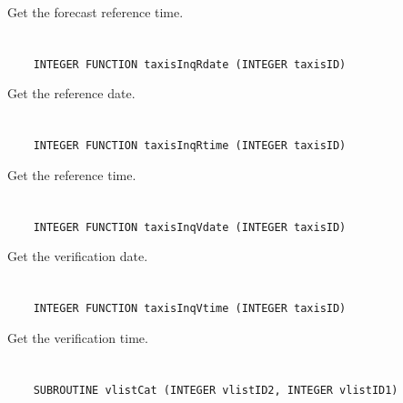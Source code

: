 Get the forecast reference time.


\section*{\tt {}}

\begin{verbatim}
    INTEGER FUNCTION taxisInqRdate (INTEGER taxisID)
\end{verbatim}

Get the reference date.


\section*{\tt {}}

\begin{verbatim}
    INTEGER FUNCTION taxisInqRtime (INTEGER taxisID)
\end{verbatim}

Get the reference time.


\section*{\tt {}}

\begin{verbatim}
    INTEGER FUNCTION taxisInqVdate (INTEGER taxisID)
\end{verbatim}

Get the verification date.


\section*{\tt {}}

\begin{verbatim}
    INTEGER FUNCTION taxisInqVtime (INTEGER taxisID)
\end{verbatim}

Get the verification time.


\section*{\tt {}}

\begin{verbatim}
    SUBROUTINE vlistCat (INTEGER vlistID2, INTEGER vlistID1)
\end{verbatim}

